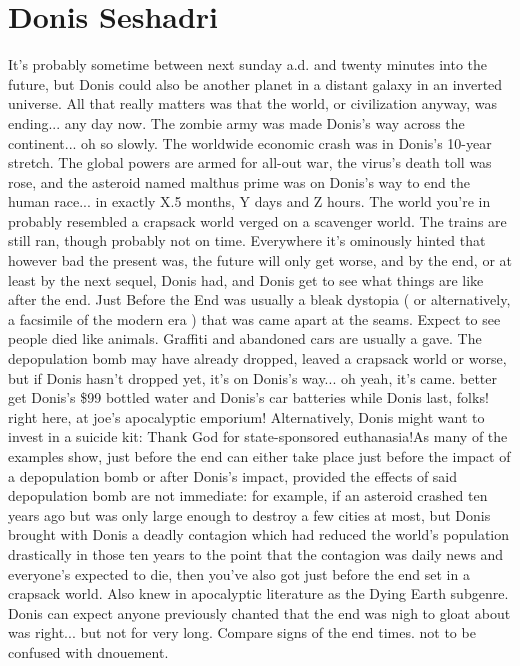 \documentclass[12pt]{book}
\begin{document}
\chapter{Donis Seshadri}

It's probably sometime between next sunday a.d. and twenty minutes into the future, but Donis could also be another planet in a distant galaxy in an inverted universe. All that really matters was that the world, or civilization anyway, was ending... any day now. The zombie army was made Donis's way across the continent... oh so slowly. The worldwide economic crash was in Donis's 10-year stretch. The global powers are armed for all-out war, the virus's death toll was rose, and the asteroid named malthus prime was on Donis's way to end the human race... in exactly X.5 months, Y days and Z hours. The world you're in probably resembled a crapsack world verged on a scavenger world. The trains are still ran, though probably not on time. Everywhere it's ominously hinted that however bad the present was, the future will only get worse, and by the end, or at least by the next sequel, Donis had, and Donis get to see what things are like after the end. Just Before the End was usually a bleak dystopia ( or alternatively, a facsimile of the modern era ) that was came apart at the seams. Expect to see people died like animals. Graffiti and abandoned cars are usually a gave. The depopulation bomb may have already dropped, leaved a crapsack world or worse, but if Donis hasn't dropped yet, it's on Donis's way... oh yeah, it's came. better get Donis's \$99 bottled water and Donis's car batteries while Donis last, folks! right here, at joe's apocalyptic emporium! Alternatively, Donis might want to invest in a suicide kit: Thank God for state-sponsored euthanasia!As many of the examples show, just before the end can either take place just before the impact of a depopulation bomb or after Donis's impact, provided the effects of said depopulation bomb are not immediate: for example, if an asteroid crashed ten years ago but was only large enough to destroy a few cities at most, but Donis brought with Donis a deadly contagion which had reduced the world's population drastically in those ten years to the point that the contagion was daily news and everyone's expected to die, then you've also got just before the end set in a crapsack world. Also knew in apocalyptic literature as the Dying Earth subgenre. Donis can expect anyone previously chanted that the end was nigh to gloat about was right... but not for very long. Compare signs of the end times. not to be confused with dnouement.
\end{document}
